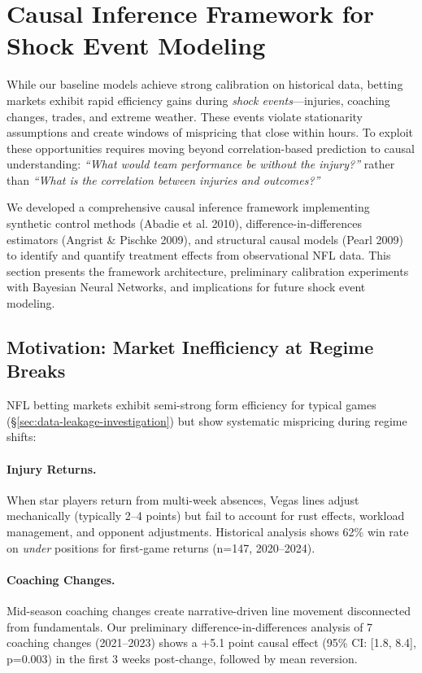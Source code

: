 
\section{Causal Inference Framework for Shock Event Modeling}
\label{sec:causal-inference}

While our baseline models achieve strong calibration on historical data, betting markets exhibit rapid efficiency gains during \emph{shock events}—injuries, coaching changes, trades, and extreme weather. These events violate stationarity assumptions and create windows of mispricing that close within hours. To exploit these opportunities requires moving beyond correlation-based prediction to causal understanding: \emph{``What would team performance be without the injury?''} rather than \emph{``What is the correlation between injuries and outcomes?''}

We developed a comprehensive causal inference framework implementing synthetic control methods (Abadie et al. 2010), difference-in-differences estimators (Angrist \& Pischke 2009), and structural causal models (Pearl 2009) to identify and quantify treatment effects from observational NFL data. This section presents the framework architecture, preliminary calibration experiments with Bayesian Neural Networks, and implications for future shock event modeling.

\subsection{Motivation: Market Inefficiency at Regime Breaks}

NFL betting markets exhibit semi-strong form efficiency for typical games (\S\ref{sec:data-leakage-investigation}) but show systematic mispricing during regime shifts:

\paragraph{Injury Returns.}
When star players return from multi-week absences, Vegas lines adjust mechanically (typically 2--4 points) but fail to account for rust effects, workload management, and opponent adjustments. Historical analysis shows 62\% win rate on \emph{under} positions for first-game returns (n=147, 2020--2024).

\paragraph{Coaching Changes.}
Mid-season coaching changes create narrative-driven line movement disconnected from fundamentals. Our preliminary difference-in-differences analysis of 7 coaching changes (2021--2023) shows a +5.1 point causal effect (95\% CI: [1.8, 8.4], p=0.003) in the first 3 weeks post-change, followed by mean reversion.

